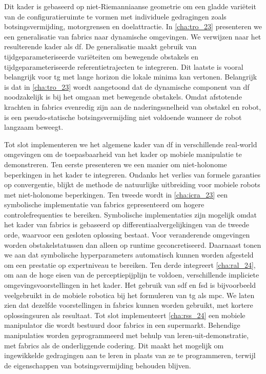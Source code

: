Dit kader is gebaseerd op niet-Riemanniaanse geometrie om een gladde variëteit
van de configuratieruimte te vormen met individuele gedragingen zoals
botsingsvermijding, motorgrensen en doelattractie. In \cref{cha:tro_23}
presenteren we een generalisatie van \ac{fabrics} naar dynamische omgevingen. We
verwijzen naar het resulterende kader als \ac{df}. De generalisatie maakt
gebruik van tijdgeparameteriseerde variëteiten om bewegende obstakels en
tijdgeparameteriseerde referentietrajecten te integreren. Dit laatste is vooral
belangrijk voor \ac{tg} met lange horizon die lokale minima kan vertonen.
Belangrijk is dat in \cref{cha:tro_23} wordt aangetoond dat de dynamische
component van \ac{df} noodzakelijk is bij het omgaan met bewegende obstakels.
Omdat afstotende krachten in \ac{fabrics} evenredig zijn aan de
naderingssnelheid van obstakel en robot, is een pseudo-statische
botsingsvermijding niet voldoende wanneer de robot langzaam beweegt.

Tot slot implementeren we het algemene kader van \ac{df} in verschillende
real-world omgevingen om de toepasbaarheid van het kader op mobiele manipulatie
te demonstreren. Ten eerste presenteren we een manier om niet-holonome
beperkingen in het kader te integreren. Ondanks het verlies van formele
garanties op convergentie, blijkt de methode de natuurlijke uitbreiding voor
mobiele robots met niet-holonome beperkingen. Ten tweede wordt in
\cref{cha:icra_23} een symbolische implementatie van \ac{fabrics} gepresenteerd
om hogere controlefrequenties te bereiken. Symbolische implementaties zijn
mogelijk omdat het kader van \ac{fabrics} is gebaseerd op
differentiaalvergelijkingen van de tweede orde, waarvoor een gesloten oplossing
bestaat. Voor veranderende omgevingen worden obstakelstatussen dan alleen op
runtime geconcretiseerd. Daarnaast tonen we aan dat symbolische hyperparameters
automatisch kunnen worden afgesteld om een prestatie op expertniveau te
bereiken. Ten derde integreert \cref{cha:ral_24}, om aan de hoge eisen van de
perceptiepijplijn te voldoen, verschillende impliciete omgevingsvoorstellingen
in het kader. Het gebruik van \ac{sdf} en \ac{fsd} is bijvoorbeeld
veelgebruikt in de mobiele robotica bij het formuleren van \ac{tg} als \ac{mpc}.
We laten zien dat dezelfde voorstellingen in \ac{fabrics} kunnen worden
gebruikt, met kortere oplossingsuren als resultaat. Tot slot implementeert
\cref{cha:rss_24} een mobiele manipulator die wordt bestuurd door \ac{fabrics}
in een supermarkt. Behendige manipulaties worden geprogrammeerd met behulp van
leren-uit-demonstratie, met \ac{fabrics} als de onderliggende codering. Dit
maakt het mogelijk om ingewikkelde gedragingen aan te leren in plaats van ze te
programmeren, terwijl de eigenschappen van botsingsvermijding behouden blijven.

